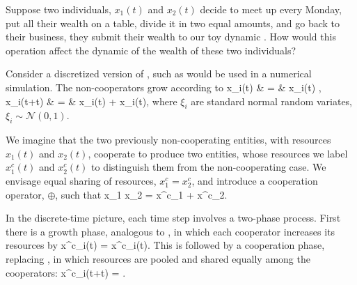 Suppose two individuals, $x_1(t)$ and $x_2(t)$ decide to meet up every Monday, put all 
their wealth on a table, divide it in two equal amounts, and go back to their business, \ie
they submit their wealth to our toy dynamic . How 
would this operation affect the dynamic of the wealth of these two individuals?

 Consider a discretized version of , such as would be used in a numerical simulation. The non-cooperators grow according to
 \bea
 \D x_i(t) & = & x_i(t) ,  \\
 x_i(t+\D t) & = & x_i(t) + \D x_i(t), 
 \eea
 where $\xi_i$ are standard normal random variates, $\xi_i\sim \mathcal{N}(0,1)$.

We imagine that the two previously non-cooperating entities, with resources $x_1(t)$ and $x_2(t)$, cooperate to produce two entities, whose resources we label $x^c_1(t)$ and $x^c_2(t)$ to distinguish them from the non-cooperating case. We envisage equal sharing of resources, $x^c_1=x^c_2$, and introduce a cooperation operator, $\oplus$, such that
 \be
 x_1 \oplus x_2 = x^c_1 + x^c_2.
 \ee
 
 In the discrete-time picture, each time step involves a two-phase process. First there is a growth phase, analogous to , in which each cooperator increases its resources by
 \be
 \D x^c_i(t) = x^c_i(t).
 \ee
 This is followed by a cooperation phase, replacing , in which resources are pooled and shared equally among the cooperators:
 \be
 x^c_i(t+\D t) = .
 \ee
 
